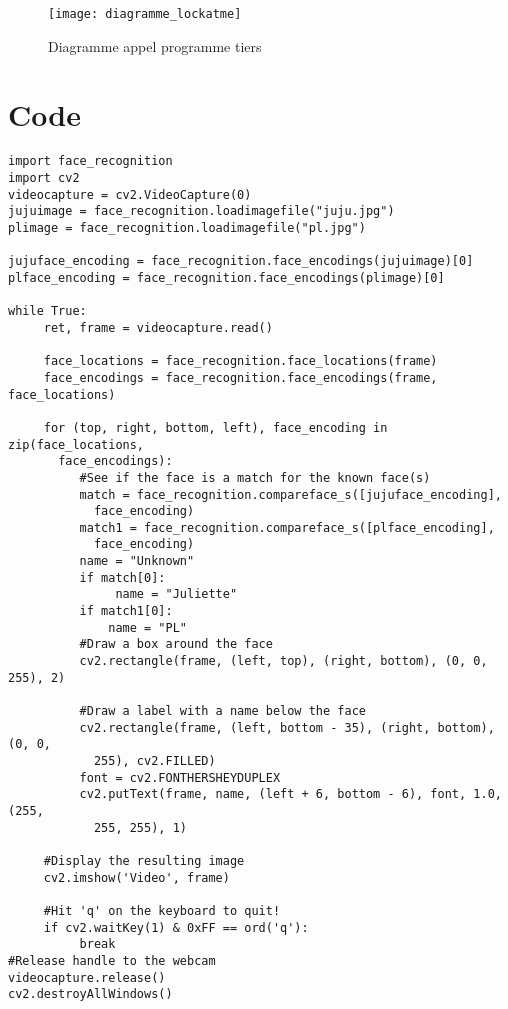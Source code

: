\begin{figure}[h]
  \texttt{[image: diagramme\_lockatme]}
  \caption{Diagramme appel programme tiers}
  \label{fig:dialam}
\end{figure}


\chapter{Code}
\newpage
\begin{verbatim}
import face_recognition
import cv2
videocapture = cv2.VideoCapture(0)
jujuimage = face_recognition.loadimagefile("juju.jpg")
plimage = face_recognition.loadimagefile("pl.jpg")

jujuface_encoding = face_recognition.face_encodings(jujuimage)[0]
plface_encoding = face_recognition.face_encodings(plimage)[0]

while True:
     ret, frame = videocapture.read()

     face_locations = face_recognition.face_locations(frame)
     face_encodings = face_recognition.face_encodings(frame, face_locations)

     for (top, right, bottom, left), face_encoding in zip(face_locations,
       face_encodings):
          #See if the face is a match for the known face(s)
          match = face_recognition.compareface_s([jujuface_encoding],
            face_encoding)
          match1 = face_recognition.compareface_s([plface_encoding],
            face_encoding)
          name = "Unknown"
          if match[0]:
               name = "Juliette"
          if match1[0]:
              name = "PL"
          #Draw a box around the face
          cv2.rectangle(frame, (left, top), (right, bottom), (0, 0, 255), 2)

          #Draw a label with a name below the face
          cv2.rectangle(frame, (left, bottom - 35), (right, bottom), (0, 0,
            255), cv2.FILLED)
          font = cv2.FONTHERSHEYDUPLEX
          cv2.putText(frame, name, (left + 6, bottom - 6), font, 1.0, (255,
            255, 255), 1)

     #Display the resulting image
     cv2.imshow('Video', frame)

     #Hit 'q' on the keyboard to quit!
     if cv2.waitKey(1) & 0xFF == ord('q'):
          break
#Release handle to the webcam
videocapture.release()
cv2.destroyAllWindows()
\end{verbatim}
